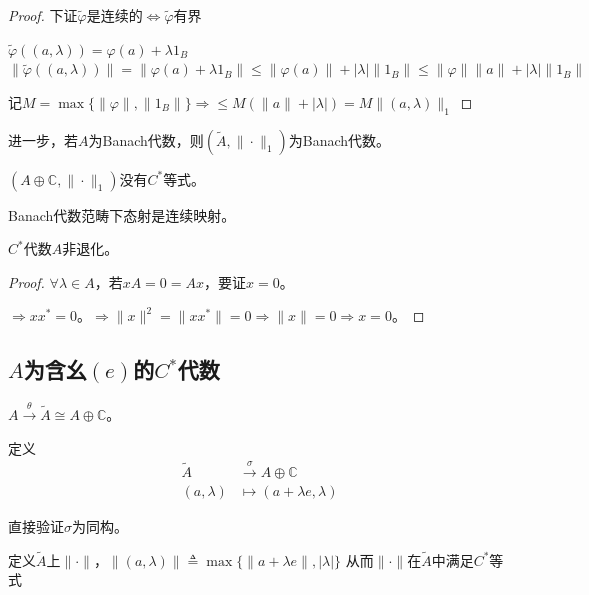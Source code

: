 \documentclass[lang=cn,a4paper,newtx,section]{elegantbook}
\begin{document}
\begin{proof}
  下证$\tilde{\varphi}$是连续的$\Leftrightarrow \tilde{\varphi}$有界
  
  $\tilde{\varphi}((a, \lambda)) = \varphi(a) + \lambda 1_B$
  \quad $\|\tilde{\varphi}((a, \lambda))\| = \|\varphi(a) + \lambda 1_B\| \leq \|\varphi(a)\| + |\lambda| \|1_B\| \leq \|\varphi\| \|a\| + |\lambda| \|1_B\|$
  
  记$M = \max\{\|\varphi\|, \|1_B\|\} \Rightarrow \leq M(\|a\| + |\lambda|) = M\|(a, \lambda)\|_1$
\end{proof}

进一步，若$A$为Banach代数，则$(\tilde{A}, \|\cdot\|_1)$为Banach代数。

\begin{remark}
      $(A \oplus \mathbb{C}, \|\cdot\|_1)$没有$C^*$等式。
\end{remark}
\begin{remark}
  Banach代数范畴下态射是连续映射。
\end{remark}

\begin{proposition}
  $C^*$代数$A$非退化。
\end{proposition}

\begin{proof}
  $\forall \lambda \in A$，若$xA = 0 = Ax$，要证$x= 0$。
  
  $\Rightarrow xx^* = 0$。$\Rightarrow \|x\|^2 = \|xx^*\| = 0 \Rightarrow \|x\| = 0 \Rightarrow x = 0$。
\end{proof}

\subsection{$A$为含幺$(e)$的$C^*$代数}



  
  $A \xrightarrow{\theta} \tilde{A} \cong A \oplus \mathbb{C}$。
  
  定义
  \begin{equation*}
    \begin{aligned}
      \tilde{A} &\xrightarrow{\sigma} A \oplus \mathbb{C} \\
      (a, \lambda) &\longmapsto (a + \lambda e, \lambda)
    \end{aligned}
  \end{equation*}
  
  直接验证$\sigma$为同构。
  
  定义$\tilde{A}$上$\|\cdot\|$，$\|(a, \lambda)\| \triangleq \max\{\|a + \lambda e\|, |\lambda|\}$
  从而$\|\cdot\|$在$\tilde{A}$中满足$C^*$等式
  
\end{document}
